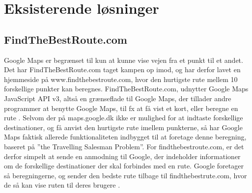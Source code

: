 \section{Eksisterende løsninger}
\subsection{FindTheBestRoute.com}
Google Maps er begrænset til kun at kunne vise vejen fra et punkt til et andet. Det har FindTheBestRoute.com taget kampen op imod, og har derfor lavet en hjemmeside på www.findthebestroute.com, hvor den hurtigste rute mellem 10 forskellige punkter kan beregnes. FindTheBestRoute.com, udnytter Google Maps JavaScript API v3, altså en grænseflade til Google Maps, der tillader andre programmer at benytte Google Maps, til fx at få vist et kort, eller beregne en rute \citep{ftbr}. Selvom der på maps.google.dk ikke er mulighed for at indtaste forskellige destinationer, og få anvist den hurtigste rute imellem punkterne, så har Google Maps faktisk allerede funktionaliteten indbygget til at foretage denne beregning, baseret på ”the Travelling Salesman Problem”. For findthebestroute.com, er det derfor simpelt at sende en anmodning til Google, der indeholder informationer om de forskellige destinationer der skal forbindes med en rute. Google foretager så beregningerne, og sender den bedste rute tilbage til findthebestrute.com, hvor de så kan vise ruten til deres brugere \citep{googleapi}.

